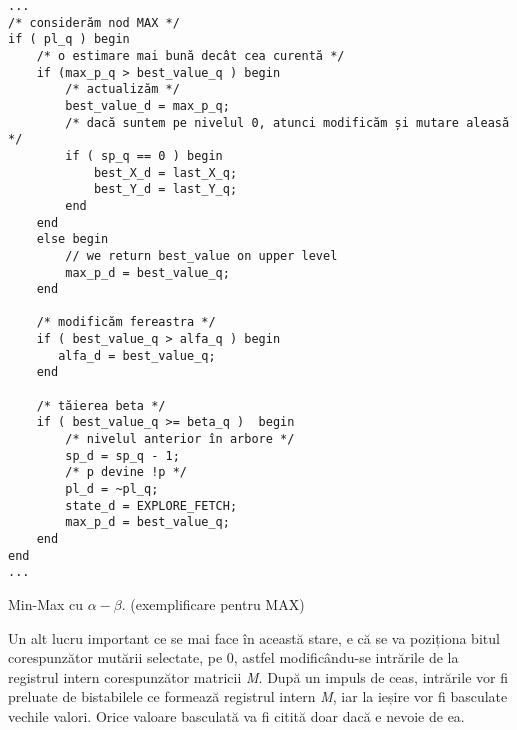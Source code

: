 \documentclass[12pt,twoside,a4paper,fleqn]{book}
\theoremstyle{definition}
\begin{document}
\begin{fragmentsursa}
\begin{scriptsize}
\begin{verbatim}
...
/* considerăm nod MAX */
if ( pl_q ) begin 
    /* o estimare mai bună decât cea curentă */
    if (max_p_q > best_value_q ) begin
        /* actualizăm */
        best_value_d = max_p_q;
        /* dacă suntem pe nivelul 0, atunci modificăm și mutare aleasă */
        if ( sp_q == 0 ) begin
            best_X_d = last_X_q;
            best_Y_d = last_Y_q;
        end
    end
    else begin
        // we return best_value on upper level
        max_p_d = best_value_q;
    end

    /* modificăm fereastra */							
    if ( best_value_q > alfa_q ) begin
       alfa_d = best_value_q;
    end

    /* tăierea beta */							
    if ( best_value_q >= beta_q )  begin
        /* nivelul anterior în arbore */
        sp_d = sp_q - 1;
        /* p devine !p */
        pl_d = ~pl_q;
        state_d = EXPLORE_FETCH;
        max_p_d = best_value_q;
    end
end
...
\end{verbatim}
\end{scriptsize}
\caption{Min-Max cu $\alpha-\beta$. (exemplificare pentru MAX)}
\label{frag_minmax}
\end{fragmentsursa}
Un alt lucru important ce se mai face în această stare, e că se va poziționa bitul corespunzător mutării selectate, pe $0$, astfel modificându-se intrările de la registrul intern corespunzător matricii \emph{M}. După un impuls de ceas, intrările vor fi preluate de bistabilele ce formează registrul intern \emph{M}, iar la ieșire vor fi basculate vechile valori. Orice valoare basculată va fi citită doar dacă e nevoie de ea.\\
\end{document}
